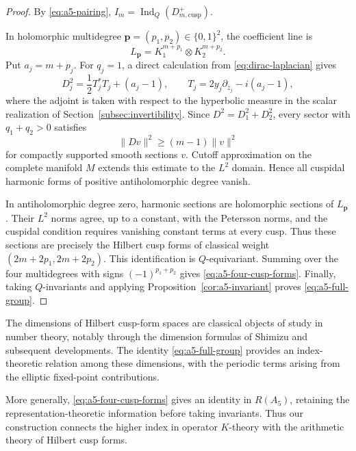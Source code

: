 \documentclass[11pt]{article}
\theoremstyle{definition}
\theoremstyle{plain}
\numberwithin{equation}{section}
\newcommand{\cusp}{\mathrm{cusp}}
\newcommand{\Ind}{\operatorname{Ind}}
\begin{document}
\begin{proof}
By \eqref{eq:a5-pairing},
$I_m=\Ind_Q(D_{m,\cusp}^+)$.

In holomorphic multidegree
$\boldsymbol p=(p_1,p_2)\in\{0,1\}^2$, the coefficient line is
\[
L_{\boldsymbol p}
=K_1^{m+p_1}\otimes K_2^{m+p_2}.
\]
Put $a_j=m+p_j$. For $q_j=1$,
a direct calculation from \eqref{eq:dirac-laplacian} gives
\[
D_j^2=\frac12T_j^*T_j+(a_j-1),
\qquad
T_j=2y_j\partial_{\bar z_j}-i(a_j-1),
\]
where the adjoint is taken with respect to the
hyperbolic measure in the scalar realization of
Section~\ref{subsec:invertibility}.
Since $D^2=D_1^2+D_2^2$, every sector with
$q_1+q_2>0$ satisfies
\[
\|Dv\|^2\geq(m-1)\|v\|^2
\]
for compactly supported smooth sections $v$.
Cutoff approximation on the complete manifold $M$
extends this estimate to the $L^2$ domain.
Hence all cuspidal harmonic forms of positive
antiholomorphic degree vanish.


In antiholomorphic degree zero, harmonic sections are
holomorphic sections of $L_{\boldsymbol p}$.
Their $L^2$ norms agree, up to a constant, with the
Petersson norms, and the cuspidal condition requires
vanishing constant terms at every cusp.
Thus these sections are precisely the Hilbert cusp
forms of classical weight
$(2m+2p_1,2m+2p_2)$.
This identification is $Q$-equivariant. Summing over the four multidegrees
with signs $(-1)^{p_1+p_2}$ gives
\eqref{eq:a5-four-cusp-forms}.
Finally, taking $Q$-invariants and applying
Proposition~\ref{cor:a5-invariant} proves
\eqref{eq:a5-full-group}.
\end{proof}

The dimensions of Hilbert cusp-form spaces are
classical objects of study in number theory,
notably through the dimension formulas of Shimizu
and subsequent developments.
The identity \eqref{eq:a5-full-group} provides
an index-theoretic relation among these dimensions,
with the periodic terms arising from the elliptic
fixed-point contributions.

More generally, \eqref{eq:a5-four-cusp-forms}
gives an identity in $R(A_5)$, retaining the
representation-theoretic information before taking
invariants. Thus our construction connects
the higher index in operator $K$-theory with
the arithmetic theory of Hilbert cusp forms.
\end{document}
